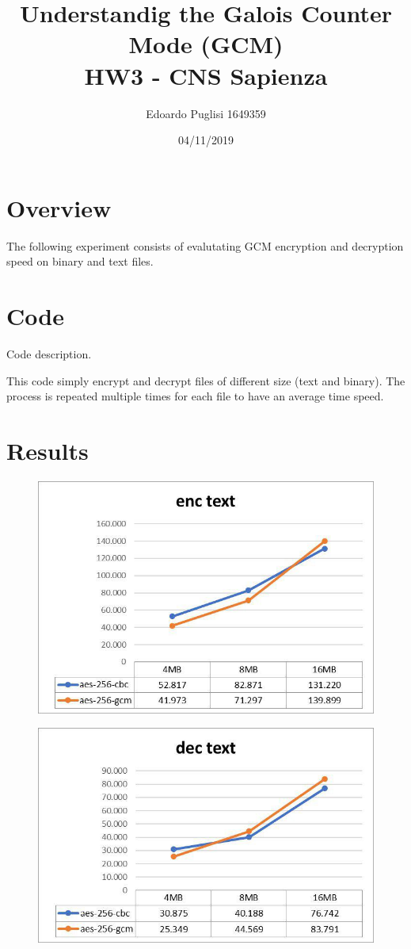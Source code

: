 \documentclass[11pt,a4paper]{article}
\title{Understandig the Galois Counter Mode (GCM) \\ HW3 - CNS Sapienza}
\author{Edoardo Puglisi 1649359}
\date{04/11/2019}
\begin{document}
\lstset{breaklines=true}
	
\maketitle
\tableofcontents
\clearpage

\section{Overview}
The following experiment consists of evalutating GCM encryption and decryption speed on binary and text files.

\section{Code}
Code description.

This code simply encrypt and decrypt files of different size (text and binary). The process is repeated multiple times for each file to have an average time speed.


\section{Results}
\begin{figure}[H]
    \centering
        \includegraphics[width=\textwidth]{et-hw3-1649359.jpg}
\end{figure}
\begin{figure}[H]
    \centering
        \includegraphics[width=\textwidth]{dt-hw3-1649359.jpg}
\end{figure}
\end{document}
